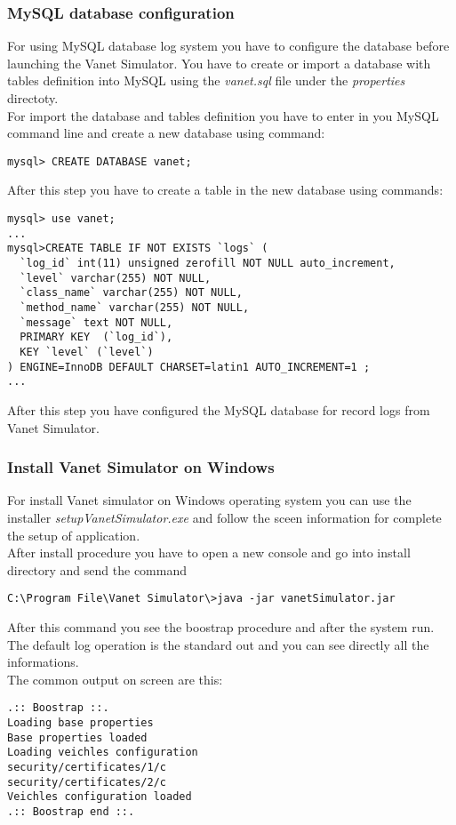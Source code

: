 \subsubsection{MySQL database configuration}
For using MySQL database log system you have to configure the database before launching the Vanet Simulator. You have to create or import a database with tables definition into MySQL using the \textit{vanet.sql} file under the \textit{properties} directoty.\\
For import the database and tables definition you have to enter in you MySQL command line and create a new database using command:
\begin{verbatim}
mysql> CREATE DATABASE vanet;
\end{verbatim}
After this step you have to create a table in the new database using commands:
\begin{verbatim}
mysql> use vanet;
...
mysql>CREATE TABLE IF NOT EXISTS `logs` (
  `log_id` int(11) unsigned zerofill NOT NULL auto_increment,
  `level` varchar(255) NOT NULL,
  `class_name` varchar(255) NOT NULL,
  `method_name` varchar(255) NOT NULL,
  `message` text NOT NULL,
  PRIMARY KEY  (`log_id`),
  KEY `level` (`level`)
) ENGINE=InnoDB DEFAULT CHARSET=latin1 AUTO_INCREMENT=1 ;
...
\end{verbatim}
After this step you have configured the MySQL database for record logs from Vanet Simulator.
\subsubsection{Install Vanet Simulator on Windows}
For install Vanet simulator on Windows operating system you can use the installer \textit{setupVanetSimulator.exe} and follow the sceen information for complete the setup of application.\\
After install procedure you have to open a new console and go into install directory and send the command
\begin{verbatim}
C:\Program File\Vanet Simulator\>java -jar vanetSimulator.jar
\end{verbatim}
After this command you see the boostrap procedure and after the system run. The default log operation is the standard out and you can see directly all the informations.\\
The common output on screen are this:
\begin{verbatim}
.:: Boostrap ::.
Loading base properties
Base properties loaded
Loading veichles configuration
security/certificates/1/c
security/certificates/2/c
Veichles configuration loaded
.:: Boostrap end ::.
\end{verbatim}
